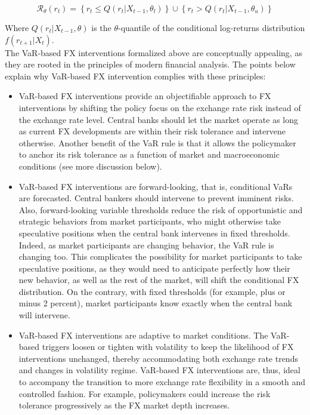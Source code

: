 \documentclass[11pt]{article}
\begin{document}
\begin{equation*}
\mathcal{R}_\theta \left(r_t \right) = \left\{r_t \leq Q(r_t | X_{t-1},
    \theta_l) \right\} \cup \left\{r_t > Q(r_t | X_{t-1},
    \theta_u) \right\}
\end{equation*}

Where $Q(r_t |  X_{t-1}, \theta)$ is the $\theta$-quantile  of the conditional
log-returns distribution $f(r_{t+1}|X_t)$.\\

The VaR-based FX interventions formalized above are conceptually appealing, as
they are  rooted in the  principles of  modern financial analysis.  The points
below explain why VaR-based FX intervention complies with these principles:

\begin{itemize}
  
\item  VaR-based FX  interventions  provide an  objectifiable  approach to  FX
interventions by shifting  the policy focus on the exchange  rate risk instead
of the  exchange rate level.  Central banks should  let the market  operate as
long as current FX developments are  within their risk tolerance and intervene
otherwise. Another benefit  of the VaR rule is that  it allows the policymaker
to  anchor its  risk  tolerance  as a  function  of  market and  macroeconomic
conditions (see more discussion below).

\item  VaR-based FX  interventions are  forward-looking, that  is, conditional
VaRs are  forecasted.  Central  bankers should  intervene to  prevent imminent
risks.   Also,   forward-looking  variable  thresholds  reduce   the  risk  of
opportunistic  and strategic  behaviors  from market  participants, who  might
otherwise take speculative positions when the central bank intervenes in fixed
thresholds. Indeed, as market participants are changing behavior, the VaR rule
is changing too.  This complicates  the possibility for market participants to
take speculative  positions, as  they would need  to anticipate  perfectly how
their  new behavior,  as  well as  the  rest  of the  market,  will shift  the
conditional  FX distribution.   On the  contrary, with  fixed thresholds  (for
example, plus or  minus 2 percent), market participants know  exactly when the
central bank will intervene.

\item  VaR-based FX  interventions  are adaptive  to  market conditions.   The
VaR-based triggers loosen or tighten with volatility to keep the likelihood of
FX interventions  unchanged, thereby  accommodating both exchange  rate trends
and changes in volatility regime.  VaR-based FX interventions are, thus, ideal
to accompany the transition to more  exchange rate flexibility in a smooth and
controlled  fashion.   For  example,  policymakers  could  increase  the  risk
tolerance progressively as the FX market depth increases.


\end{itemize}
\end{document}
